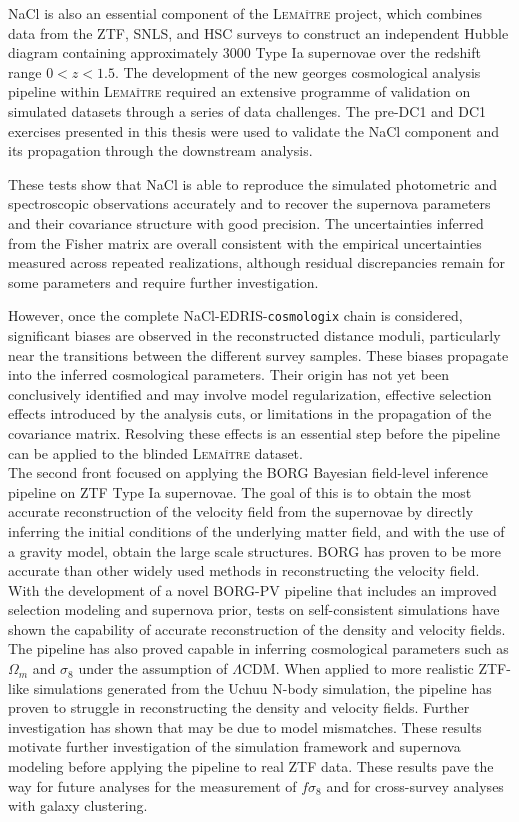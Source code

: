 NaCl is also an essential component of the \textsc{Lemaître} project, which 
combines data from the ZTF, SNLS, and HSC surveys to construct an 
independent Hubble diagram containing approximately 3000 Type Ia 
supernovae over the redshift range $0<z<1.5$. The development of the new 
georges cosmological analysis pipeline within \textsc{Lemaître} required an 
extensive programme of validation on simulated datasets through a series 
of data challenges. The pre-DC1 and DC1 exercises presented in this 
thesis were used to validate the NaCl component and its propagation 
through the downstream analysis. 

These tests show that NaCl is able to reproduce the simulated 
photometric and spectroscopic observations accurately and to recover the 
supernova parameters and their covariance structure with good precision. 
The uncertainties inferred from the Fisher matrix are overall consistent 
with the empirical uncertainties measured across repeated realizations, 
although residual discrepancies remain for some parameters and require 
further investigation. 

However, once the complete NaCl-EDRIS-\texttt{cosmologix} chain is considered, 
significant biases are observed in the reconstructed distance moduli, 
particularly near the transitions between the different survey samples. 
These biases propagate into the inferred cosmological parameters. Their 
origin has not yet been conclusively identified and may involve model 
regularization, effective selection effects introduced by the analysis 
cuts, or limitations in the propagation of the covariance matrix. 
Resolving these effects is an essential step before the pipeline can be 
applied to the blinded \textsc{Lemaître} dataset. \\


The second front focused on applying the BORG Bayesian field-level inference pipeline on ZTF Type Ia supernovae. The goal of this is to obtain the most accurate reconstruction 
of the velocity field from the supernovae by directly inferring the initial conditions of the underlying matter field, and with the use of a gravity model, obtain the 
large scale structures. BORG has proven to be more accurate than other widely used methods in reconstructing the velocity field. With the development of a novel BORG-PV pipeline 
that includes an improved selection modeling and supernova prior, tests on self-consistent simulations have shown the capability of accurate reconstruction of the density and velocity 
fields. The pipeline has also proved capable in inferring cosmological parameters such as $\Omega_m$ and $\sigma_8$ under the assumption of $\Lambda$CDM. 
When applied to more realistic ZTF-like simulations generated from the 
Uchuu N-body simulation, the pipeline has proven to struggle in reconstructing the 
density and velocity fields. Further investigation has shown that may be due to model mismatches. 
These results motivate further investigation of the simulation framework and supernova modeling before applying the pipeline to real ZTF data.
These results pave the way for future analyses for the measurement of $f\sigma_8$ and for cross-survey analyses with galaxy clustering. 



